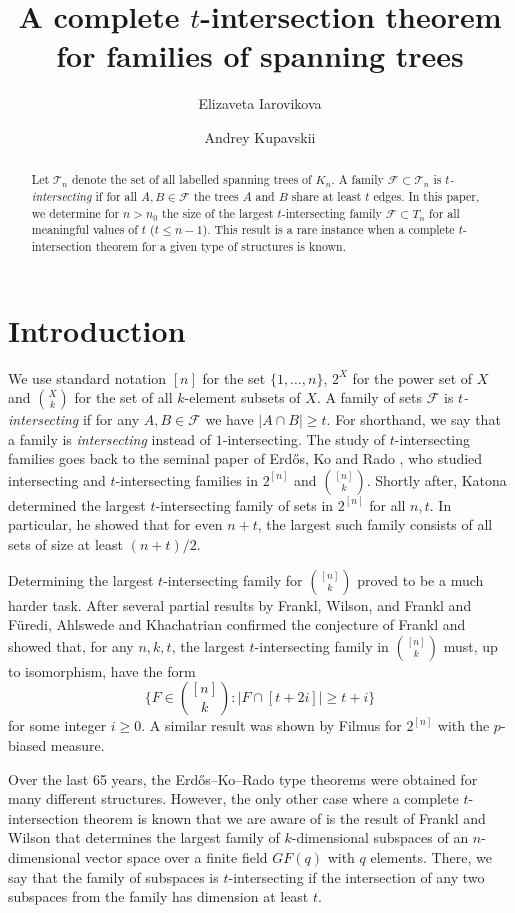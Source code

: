 \documentclass[11pt,letterpaper]{amsart}
\title{A complete $t$-intersection theorem for families of spanning trees}
\author{Elizaveta Iarovikova}
\author{Andrey Kupavskii}
\date{}
\renewcommand{\le}{\leqslant}
\renewcommand{\ge}{\geqslant}
\newcommand{\ff}{\mathcal{F}}
\newcommand{\m}{\mathcal }
\newcommand{\T}{\mathcal{T}}
\begin{document}
\maketitle
\begin{abstract}
    Let $\m T_n$ denote the set of all labelled spanning trees of $K_n$. A family $\ff \subset \T_n$ is \textit{$t$-intersecting} if for all $A, B \in \ff$ the  trees $A$ and $B$ share at least $t$ edges. In this paper, we determine for $n>n_0$  the size of the largest $t$-intersecting family $\ff\subset T_n$ for all meaningful values of $t$ ($t\le n-1$). This result is a rare instance  when a complete $t$-intersection theorem for a given type of structures is known. 
\end{abstract}
\section{Introduction}
We use standard notation $[n]$ for the set $\{1,\ldots, n\}$, $2^X$ for the power set of $X$ and ${X\choose k}$ for the set of all $k$-element subsets of $X$. A family of sets $\ff$ is {\it $t$-intersecting} if for any $A,B\in \ff$ we have $|A\cap B|\ge t.$ For shorthand, we say that a family is {\it intersecting} instead of $1$-intersecting. The study of $t$-intersecting families goes back to the seminal paper of Erd\H os, Ko and Rado \cite{EKR}, who studied intersecting and $t$-intersecting families in $2^{[n]}$ and ${[n]\choose k}$. Shortly after, Katona \cite{Kat} determined the largest $t$-intersecting family of sets in $2^{[n]}$ for all $n,t.$ In particular, he showed that for even $n+t$, the largest such family consists of all sets of size at least $(n+t)/2$.  

Determining the largest $t$-intersecting family for ${[n]\choose k}$ proved to be a much harder task. After several partial results \cite{F1, W, FF3} by Frankl, Wilson, and Frankl and F\"uredi, Ahlswede and Khachatrian \cite{AK} confirmed the conjecture of Frankl \cite{F1} and showed that, for any $n,k,t$, the largest $t$-intersecting family in ${[n]\choose k}$ must, up to isomorphism, have the form 
\begin{equation}\label{exfra} \Big\{F\in {[n]\choose k}: |F\cap[t+2i]|\ge t+i\Big\}  \end{equation}
for some integer $i\ge 0$. A similar result was shown by Filmus \cite{Film} for $2^{[n]}$ with the $p$-biased measure.

Over the last 65 years, the Erd\H os--Ko--Rado type theorems were obtained for many different structures. However, the only other case where a complete $t$-intersection theorem is known that we are aware of is the result of Frankl and Wilson \cite{FW86} that determines the largest family of $k$-dimensional subspaces of an $n$-dimensional vector space over a finite field $GF(q)$ with $q$ elements. There, we say that the family of subspaces is $t$-intersecting if the intersection of any two subspaces from the family has dimension at least $t$.
\end{document}
